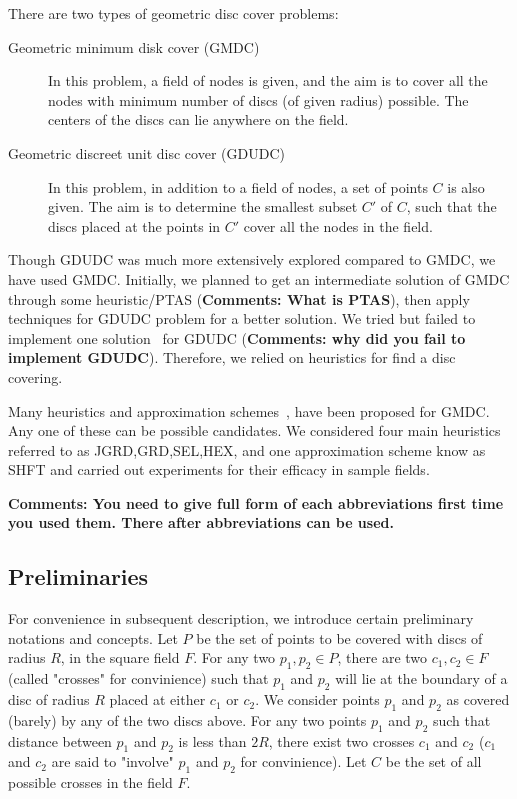 There are two types of geometric disc cover problems:

\begin{description}
\item[Geometric minimum disk cover (GMDC)] In this problem, a field of nodes is given, and the aim is to cover all the nodes with minimum number of discs (of given radius) possible. The centers of the discs can lie anywhere on the field.
\item[Geometric discreet unit disc cover (GDUDC)] In this problem, in addition to a field of nodes, a set of points $C$ is also given. The aim is to determine the smallest subset $C'$ of $C$, such that the discs placed at the points in $C'$ cover all the nodes in the field.
\end{description}

Though GDUDC was much more extensively explored compared to GMDC, we have 
used GMDC. Initially, we planned to get an intermediate solution of GMDC through some heuristic/PTAS ({\bf Comments: What is PTAS}), then apply techniques for GDUDC problem for a better solution. We tried but failed to implement one solution~\cite{carmi} for GDUDC ({\bf Comments: why did you fail to implement GDUDC}). Therefore, we relied on heuristics for find a disc covering.

Many heuristics and approximation schemes~\cite{shifting}, \cite{appScheme} have been proposed for GMDC. Any one of these can be possible candidates. We considered four main heuristics referred to as JGRD,GRD,SEL,HEX, and one approximation scheme know as SHFT and carried out experiments for their efficacy in sample fields. 

{\bf Comments: You need to give full form of each abbreviations first time you used them. There after abbreviations can be used.}

\subsection{Preliminaries}\label{subsec:prelim}

For convenience in subsequent description, we introduce certain preliminary
notations and concepts. Let $P$ be the set of points to be covered with discs of radius $R$, in the square field $F$. For any two $p_1, p_2 \in P$, there are two $c_1,c_2 \in F$ (called "crosses" for convinience) such that $p_1$ and $p_2$ will lie at the boundary of a disc of radius $R$ placed at either $c_1$ or $c_2$. We consider points $p_1$ and $p_2$ as covered (barely) by any of the two discs above. For any two points $p_1$ and $p_2$ such that distance between $p_1$ and $p_2$ is less than $2R$, there exist two crosses $c_1$ and $c_2$ ($c_1$ and $c_2$ are said to "involve" $p_1$ and $p_2$ for convinience). Let $C$ be the set of all possible crosses in the field $F$.

